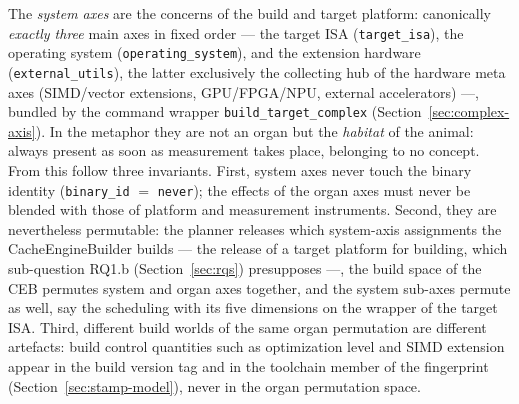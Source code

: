 \begin{nurkurz}
The \emph{system axes} are the concerns of the build and target platform: canonically \emph{exactly three}
main axes in fixed order --- the target ISA (\texttt{target\_isa}), the operating system
(\texttt{operating\_system}), and the extension hardware (\texttt{external\_utils}), the latter exclusively
the collecting hub of the hardware meta axes (SIMD/vector extensions, GPU/FPGA/NPU, external accelerators)
---, bundled by the command wrapper \texttt{build\_target\_complex} (Section~\ref{sec:complex-axis}). In
the metaphor they are not an organ but the \emph{habitat} of the animal: always present as soon as
measurement takes place, belonging to no concept. From this follow three invariants. First, system axes
never touch the binary identity (\texttt{binary\_id} $=$ \texttt{never}); the effects of the organ axes
must never be blended with those of platform and measurement instruments. Second, they are nevertheless
permutable: the planner releases which system-axis assignments the CacheEngineBuilder builds --- the
release of a target platform for building, which sub-question RQ1.b (Section~\ref{sec:rqs}) presupposes
---, the build space of the CEB permutes system and organ axes together, and the system sub-axes permute
as well, say the scheduling with its five dimensions on the wrapper of the target ISA\@. Third, different
build worlds of the same organ permutation are different artefacts: build control quantities such as
optimization level and SIMD extension appear in the build version tag and in the toolchain member of the
fingerprint (Section~\ref{sec:stamp-model}), never in the organ permutation space.
\end{nurkurz}


